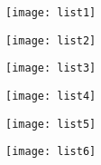 \documentclass[russian,utf8, a1paper]{eskdgraph}
\begin{document}
\begin{ESKDdrawing}

\texttt{[image: list1]}

\end{ESKDdrawing}

\begin{ESKDdrawing}
\texttt{[image: list2]}
\end{ESKDdrawing}

\begin{ESKDdrawing}
\texttt{[image: list3]}
\end{ESKDdrawing}

\begin{ESKDdrawing}
\texttt{[image: list4]}
\end{ESKDdrawing}

\begin{ESKDdrawing}
\texttt{[image: list5]}
\end{ESKDdrawing}

\begin{ESKDdrawing}
\texttt{[image: list6]}
\end{ESKDdrawing}
\end{document}
